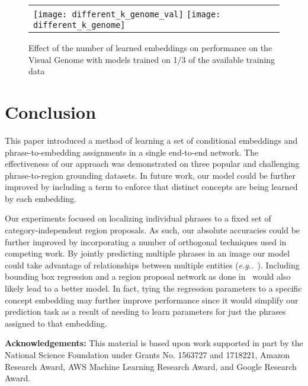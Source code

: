 \documentclass[runningheads]{llncs}
\makeatletter
\DeclareRobustCommand\onedot{\futurelet\@let@token\@onedot}
\def\@onedot{\ifx\@let@token.\else.\null\fi\xspace}
\def\eg{\emph{e.g}\onedot} \def\Eg{\emph{E.g}\onedot}
\def\etal{\emph{et al}\onedot}
\makeatother
\begin{document}
\begin{figure}[t]
\centering
\begin{tabular}{lr}
\texttt{[image: different\_k\_genome\_val]}
\texttt{[image: different\_k\_genome]}
\end{tabular}
\caption{Effect of the number of learned embeddings on performance on the Visual Genome with models trained on 1/3 of the available training data}
\label{fig:choice_of_K_genome}
\end{figure}%
\section{Conclusion}

This paper introduced a method of learning a set of conditional embeddings and phrase-to-embedding assignments in a single end-to-end network.  The effectiveness of our approach was demonstrated on three popular and challenging phrase-to-region grounding datasets.  In future work, our model could be further improved by including a term to enforce that distinct concepts are being learned by each embedding. 

Our experiments focused on localizing individual phrases to a fixed set of category-independent region proposals. As such, our absolute accuracies could be further improved by incorporating a number of orthogonal techniques used in competing work. By jointly predicting multiple phrases in an image our model could take advantage of relationships between multiple entities (\eg~\cite{plummerPLCLC2017,wang2016matching,ChenICMR2017,ChenICCV2017}).  Including bounding box regression and a region proposal network as done in~\cite{ChenICMR2017,ChenICCV2017} would also likely lead to a better model.  In fact, tying the regression parameters to a specific concept embedding may further improve performance since it would simplify our prediction task as a result of needing to learn parameters for just the phrases assigned to that embedding.
\smallskip

\noindent\textbf{Acknowledgements:} This material is based upon work supported in part by the National Science Foundation under Grants No. 1563727 and 1718221, Amazon Research Award, AWS Machine Learning Research Award, and Google Research Award. 

%
%
%


\end{document}
